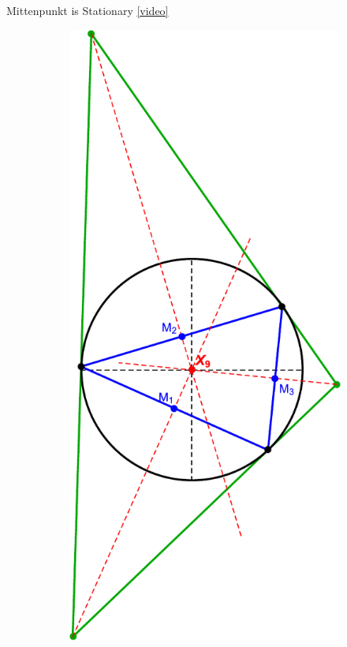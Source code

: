 \begin{frame}{Mittenpunkt is Stationary  \href{https://youtu.be/tMrBqfRBYik}{[video]}}
\begin{figure}
\begin{subfigure}[t]{0.45\textwidth}
         \includegraphics[height=.8\textheight]{pics/0053_mitten_rot_scaled.pdf}
     \end{subfigure}
\end{figure}
\end{frame}

